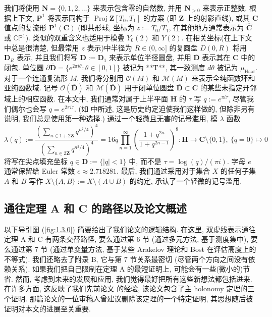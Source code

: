 \begin{remark}[符号注记]\label{rem:1.2.7}
我们将使用 $\mathbf{N} = \{0, 1, 2, \dots\}$ 来表示包含零的自然数, 
并用 $\mathbf{N}_{>0}$ 来表示正整数.
根据上下文, $\mathbf{P}^1$ 将表示同构于 $\operatorname{Proj} \mathbf{Z}[T_0, T_1]$ 的方案 (即 $\mathbf{Z}$ 上的射影直线), 
或其 $\mathbf{C}$ 值点的复流形 $\mathbf{P}^1(\mathbf{C})$ 
(即共形球, 坐标为 $z := T_0/T_1$, 在其他地方通常表示为 $\widehat{\mathbf{C}}$ 或 $\mathbb{CP}^1$).
类似的双重含义也适用于模叠 $Y_0(2)$ 和 $Y(2)$.
在相关坐标(在上下文中总是很清楚, 但最常用 $z$ 表示)中半径为 $R \in (0,\infty]$ 的复圆盘 $D(0,R)$ 将用 $\mathbf{D}_R$ 表示, 
并且我们将写 $\mathbf{D} := \mathbf{D}_1$ 来表示单位半径圆盘, 并用 $\overline{\mathbf{D}}$ 表示其在 $\mathbf{C}$ 中的闭包.
单位圆 $\partial \overline{\mathbf{D}} = \{e^{2\pi i\theta} : \theta \in [0,1]\}$ 被记为 **T**, 其一致测度 $d\theta$ 被记为 $\mu_{\text{Haar}}$.
对于一个连通复流形 $M$, 我们将分别用 $\mathcal{O}(M)$ 和 $\mathcal{M}(M)$ 来表示全纯函数环和亚纯函数域.
记号 $\mathcal{O}(\overline{\mathbf{D}})$ 和 $\mathcal{M}(\overline{\mathbf{D}})$ 用于闭单位圆盘 $\overline{\mathbf{D}} \subset \mathbf{C}$ 的某些未指定开邻域上的相应函数.
在本文中, 我们通常对属于上半平面 $\mathbf{H}$ 的 $\tau$ 写 $q := e^{\pi i \tau}$, 
尽管我们偶尔也会写 $q = e^{2\pi i \tau}$.
(如 \cite{CDT21} 中所述, 这是历史约定迫使我们这样做的, 但除非另有说明, 我们总是使用第一种选择.)
通过一个轻微且无害的记号滥用, 模 $\lambda$ 函数
\begin{equation}\label{eq:1.2.8}
\lambda(q) := \frac{\left(\sum_{n \in 1+2\mathbf{Z}} q^{n^2/4}\right)^4}{\left(\sum_{n \in 2\mathbf{Z}} q^{n^2/4}\right)^4} = 16q \prod_{n=1}^{\infty} \left(\frac{1+q^{2n}}{1+q^{2n-1}}\right)^8 : \mathbf{H} \to \mathbf{C} \setminus \{0,1\}, \ \{q=0\} \mapsto 0
\end{equation}
将写在尖点填充坐标 $q \in \mathbf{D} := \{|q| < 1\}$ 中, 而不是 $\tau = \log(q)/(\pi i)$.
字母 $e$ 通常保留给 Euler 常数 $e \approx 2.718281$.
最后, 我们通过采用对于集合 $X$ 的任何子集 $A$ 和 $B$ 写作 $X \setminus \{A, B\} := X \setminus (A \cup B)$ 的约定, 承认了一个轻微的记号滥用.\end{remark}

\subsection{通往定理 A 和 C 的路径以及论文概述}\label{sec:1.3}

以下导引图 (\autoref{fig:1.3.0}) 简要给出了我们论文的逻辑结构.
在这里, 双虚线表示通往定理 A 和 C 有两条交替路径, 
要么通过第 6 节 (通过多元方法, 基于测度集中), 
要么通过第 7 节 (通过单变量方法, 基于某些 Arakelov 理论和 Bost 在评估高度上的不等式).
我们还略去了附录 B, 它与第 7 节关系最密切 (尽管两个方向之间没有依赖关系).
如果我们把自己限制在定理 A 的最短证明上, 可能会有一些(微小的)节省.
然而, 考虑到未来的发展和应用, 我们觉得最好把所有这些新想法都包括进来.
在许多方面, 这反映了我们先前论文 \cite{CDT21} 的经验, 该论文包含了主 holonomy 定理的三个证明.
那篇论文的一位审稿人曾建议删除该定理的一个特定证明, 其思想随后被证明对本文的进展至关重要.

